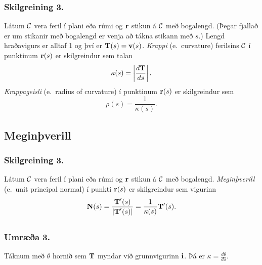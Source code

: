  \subsubsection{Skilgreining 3.}
   Látum $\cal C$ vera feril í plani eða rúmi og
$\mbox{${\bf r}$}$ stikun á $\cal C$ með bogalengd.  (Þegar fjallað er um stikanir
með bogalengd er venja að tákna stikann með $s$.) Lengd hraðavigurs
 er alltaf 1 og
því er $\mbox{${\bf T}$}(s)=\mbox{${\bf v}$}(s)$.   {\em Krappi} (e.~curvature) ferilsins $\cal
C$ í punktinum $\mbox{${\bf r}$}(s)$ er skilgreindur sem talan 
$$\kappa(s)=\left|\frac{d\mbox{${\bf T}$}}{ds}\right|.$$
{\em Krappageisli} (e.~radius of curvature) í punktinum $\mbox{${\bf r}$}(s)$ er
skilgreindur sem  
$$\rho(s)=\frac{1}{\kappa(s)}.$$
 



\subsection{Meginþverill}
 \subsubsection{Skilgreining 3.}
   Látum $\cal C$ vera feril í plani eða rúmi og $\mbox{${\bf r}$}$ stikun á $\cal C$ með bogalengd.  {\em Meginþverill} (e.~unit principal normal) í punkti $\mbox{${\bf r}$}(s)$ er skilgreindur sem vigurinn 
$$\mbox{${\bf N}$}(s)=\frac{\mbox{${\bf T}$}'(s)}{|\mbox{${\bf T}$}'(s)|}=\frac{1}{\kappa(s)}\mbox{${\bf T}$}'(s).$$
 



\subsection{}
 \subsubsection{Umræða 3.}
  Táknum með $\theta$ hornið sem $\mbox{${\bf T}$}$ myndar við grunnvigurinn $\mbox{${\bf i}$}$. Þá er $\kappa = \frac{d\theta}{ds}$.
 
